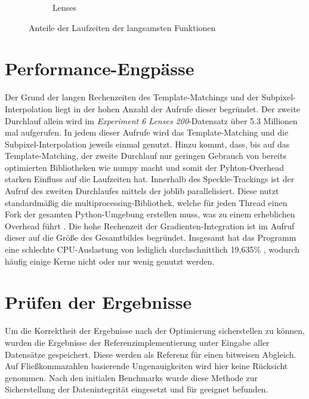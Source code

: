\begin{center}
\begin{figure}[htbp]
\begin{subfigure}[b]{0.5\textwidth}
			\caption{Lenses}
			\label{fig:perc_slow_lenses}
		\end{subfigure}
		\caption{Anteile der Laufzeiten der langsamsten Funktionen}
		\label{fig:perc_slow}
	\end{figure}
\end{center}

\section{Performance-Engpässe}

Der Grund der langen Rechenzeiten des Template-Matchings und der Subpixel-Interpolation liegt in der hohen Anzahl der Aufrufe dieser begründet. Der zweite Durchlauf allein wird im \textit{Experiment 6 Lenses 200}-Datensatz über 5.3 Millionen mal aufgerufen. In jedem dieser Aufrufe wird das Template-Matching und die Subpixel-Interpolation jeweils einmal genutzt. Hinzu kommt, dass, bis auf das Temp\-late-Match\-ing, der zweite Durchlauf nur geringen Gebrauch von bereits optimierten Bibliotheken wie numpy macht und somit der Pyhton-Overhead starken Einfluss auf die Laufzeiten hat. Innerhalb des Speckle-Trackings ist der Aufruf des zweiten Durchlaufes mittels der joblib parallelisiert. Diese nutzt standardmäßig die multiprocessing-Bibliothek, welche für jeden Thread einen Fork der gesamten Python-Umgebung erstellen muss, was zu einem erheblichen Overhead führt \cite{GVB+18}. Die hohe Rechenzeit der Gradienten-Integration ist im Aufruf dieser auf die Größe des Gesamtbildes begründet. Insgesamt hat das Programm eine schlechte CPU-Auslastung von lediglich durchschnittlich 19,635\% \cite{Sch18b}, wodurch häufig einige Kerne nicht oder nur wenig genutzt werden. 

\section{Prüfen der Ergebnisse}

Um die Korrektheit der Ergebnisse nach der Optimierung sicherstellen zu können, wurden die Ergebnisse der Referenzimplementierung unter Eingabe aller Datensätze gespeichert. Diese werden als Referenz für einen bitweisen Abgleich. Auf Fließkommazahlen basierende Ungenauigkeiten wird hier keine Rücksicht genommen. Nach den initialen Benchmarks wurde diese Methode zur Sicherstellung der Datenintegrität eingesetzt und für geeignet befunden. 